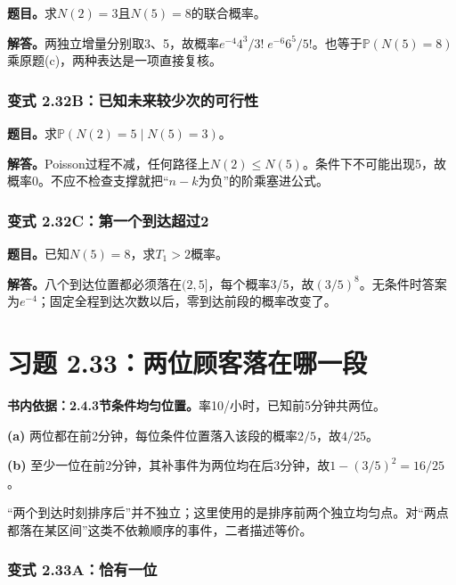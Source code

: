 \documentclass[12pt,a4paper,UTF8,fontset=fandol]{ctexart}
\begin{document}
\textbf{题目。}求\(N(2)=3\)且\(N(5)=8\)的联合概率。

\textbf{解答。}两独立增量分别取3、5，故概率\(e^{-4}4^3/3!\;e^{-6}6^5/5!\)。也等于\(\mathbb P(N(5)=8)\)乘原题(c)，两种表达是一项直接复核。

\subsubsection{变式
2.32B：已知未来较少次的可行性}\label{ux53d8ux5f0f-2.32bux5df2ux77e5ux672aux6765ux8f83ux5c11ux6b21ux7684ux53efux884cux6027}

\textbf{题目。}求\(\mathbb P(N(2)=5\mid N(5)=3)\)。

\textbf{解答。}Poisson过程不减，任何路径上\(N(2)\le N(5)\)。条件下不可能出现5，故概率0。不应不检查支撑就把``\(n-k\)为负''的阶乘塞进公式。

\subsubsection{变式
2.32C：第一个到达超过2}\label{ux53d8ux5f0f-2.32cux7b2cux4e00ux4e2aux5230ux8fbeux8d85ux8fc72}

\textbf{题目。}已知\(N(5)=8\)，求\(T_1>2\)概率。

\textbf{解答。}八个到达位置都必须落在\((2,5]\)，每个概率3/5，故\((3/5)^8\)。无条件时答案为\(e^{-4}\)；固定全程到达次数以后，零到达前段的概率改变了。

\section{习题
2.33：两位顾客落在哪一段}\label{ux4e60ux9898-2.33ux4e24ux4f4dux987eux5ba2ux843dux5728ux54eaux4e00ux6bb5}

\textbf{书内依据：2.4.3节条件均匀位置。}率10/小时，已知前5分钟共两位。

\textbf{(a)}
两位都在前2分钟，每位条件位置落入该段的概率\(2/5\)，故\(\boxed{4/25}\)。

\textbf{(b)}
至少一位在前2分钟，其补事件为两位均在后3分钟，故\(\boxed{1-(3/5)^2=16/25}\)。

``两个到达时刻排序后''并不独立；这里使用的是排序前两个独立均匀点。对``两点都落在某区间''这类不依赖顺序的事件，二者描述等价。

\subsubsection{变式
2.33A：恰有一位}\label{ux53d8ux5f0f-2.33aux6070ux6709ux4e00ux4f4d}
\end{document}
